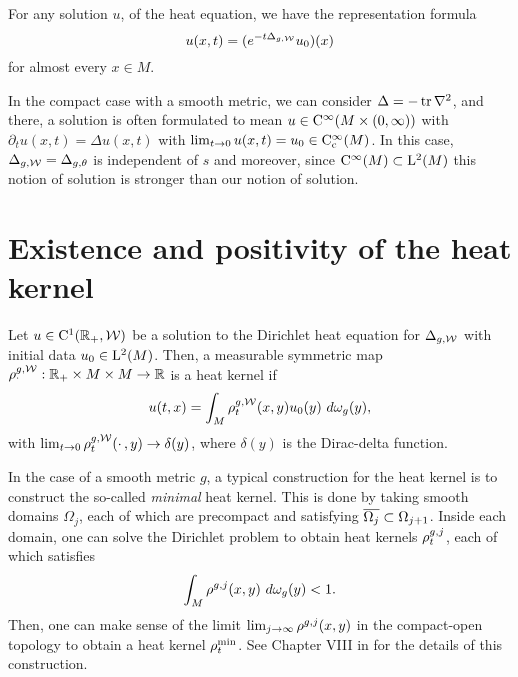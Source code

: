 \documentclass[a4paper, 12pt]{amsart}
\begin{document}
For any solution \(u\), of the heat equation, we have the representation formula
\[
u(x,t) = (e^{-t \Delta_{g,\cW}}u_0)(x)
\]
for almost every $x \in M$.
 
\begin{rem}
In the compact case with a smooth metric, we can consider $\Delta = -\tr \nabla^2$,
and there,  a solution is often formulated to mean $u \in \Ck{\infty}( M \times (0, \infty))$
with $\partial_t u(x,t) = \Delta u(x,t)$ with 
$\lim_{t \to 0} u(x,t) = u_0 \in \Ck[c]{\infty}(M)$.
In this case, $\Delta_{g,\cW} = \Delta_{g,\theta}$ is independent
of $s$ and moreover, since $\Ck{\infty}(M) \subset \Lp{2}(M)$
this notion of solution is stronger than our notion of solution.

\end{rem}

\section{Existence and positivity of the heat kernel}

\begin{defn}
Let $u \in \Ck{1}(\R_+, \cW)$ be a solution to the 
Dirichlet heat equation
for $\Delta_{g,\cW}$ with initial data $u_0 \in \Lp{2}(M)$. Then, a 
measurable symmetric map $\hk^{g,\cW}_{\mdot}: \R_+ \times M \times M \to \R$
is a heat kernel if 
$$u(t,x) = \int_{M} \hk^{g,\cW}_t(x,y) u_0(y)\ d\omega_g(y),$$
with $\lim_{t \to 0} \hk_t^{g,\cW}(\mdot,y) \to \delta(y)$, 
where $\delta(y)$ is the Dirac-delta function.
\end{defn}

In the case of a smooth metric $g$, a typical construction for
the heat kernel is to construct the so-called \emph{minimal} heat kernel.
This is done by taking smooth domains $\Omega_j$, 
each of which are precompact and satisfying $\close{\Omega_j} \subset \Omega_{j+1}$. 
Inside each domain, one can solve the Dirichlet problem
to obtain heat kernels $\hk^{g,j}_{t}$, each of which
satisfies 
$$ \int_{M} \hk^{g,j}(x,y)\ d\omega_g(y) < 1.$$
Then, one can make sense of the limit $\lim_{j \to \infty} \hk^{g,j}(x,y)$
in the compact-open topology to obtain a heat kernel $\hk^{\min}_t$.
See Chapter VIII in \cite{Chavel} for the details
of this construction.
\end{document}
